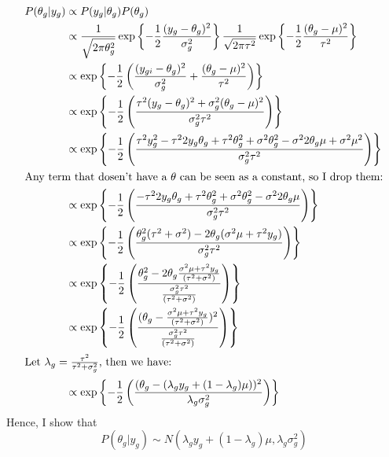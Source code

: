 \documentclass[paper=letter, fontsize=11pt]{scrartcl} %
\numberwithin{equation}{section} %
\numberwithin{figure}{section} %
\numberwithin{table}{section} %
\begin{document}
\subsection*{}
\begin{align*}
\begin{split}
P(\theta_g|y_{g}) &\propto P(y_{g}|\theta_g) P(\theta_g)\\
&\propto \frac{1}{\sqrt{2\pi\theta_g^2}}\exp\left\{-\frac{1}{2}\frac{(y_{g}-\theta_g)^2}{\sigma_g^2} \right\} \frac{1}{\sqrt{2\pi\tau^2}}\exp\left\{-\frac{1}{2}\frac{(\theta_g-\mu)^2}{\tau^2} \right\}\\
&\propto \exp\left\{-\frac{1}{2}\left(\frac{(y_{gi}-\theta_g)^2}{\sigma_g^2}+\frac{(\theta_g-\mu)^2}{\tau^2} \right)\right\}\\
&\propto \exp\left\{-\frac{1}{2}\left(\frac{\tau^2(y_{g}-\theta_g)^2+\sigma_g^2(\theta_g-\mu)^2}{\sigma_g^2\tau^2} \right)\right\}\\	
&\propto \exp\left\{-\frac{1}{2}\left(\frac{\tau^2 y_{g}^2-\tau^22y_{g}\theta_g + \tau^2\theta_g^2+\sigma^2\theta_g^2 - \sigma^22\theta_g\mu + \sigma^2\mu^2}{\sigma_g^2\tau^2} \right)\right\}\\
\intertext{Any term that dosen't have a $\theta$ can be seen as a constant, so I drop them:}	
&\propto \exp\left\{-\frac{1}{2}\left(\frac{-\tau^22y_{g}\theta_g + \tau^2\theta_g^2+\sigma^2\theta_g^2 - \sigma^22\theta_g\mu}{\sigma_g^2\tau^2} \right)\right\}\\
&\propto \exp\left\{-\frac{1}{2}\left(\frac{\theta_g^2(\tau^2+\sigma^2) - 2\theta_g(\sigma^2\mu + \tau^2y_{g})}{\sigma_g^2\tau^2} \right)\right\}\\
&\propto \exp\left\{-\frac{1}{2}\left(\frac{\theta_g^2 - 2\theta_g\frac{\sigma^2\mu + \tau^2y_{g}}{(\tau^2+\sigma^2)}}{\frac{\sigma_g^2\tau^2}{(\tau^2+\sigma^2)}} \right)\right\}\\
&\propto \exp\left\{-\frac{1}{2}\left(\frac{(\theta_g - \frac{\sigma^2\mu + \tau^2y_{g}}{(\tau^2+\sigma^2)})^2}{\frac{\sigma_g^2\tau^2}{(\tau^2+\sigma^2)}} \right)\right\}\\
\intertext{Let $\lambda_g = \frac{\tau^2}{\tau^2+\sigma_g^2}$, then we have:}	
&\propto \exp\left\{-\frac{1}{2}\left(\frac{(\theta_g -(\lambda_g y_g + (1-\lambda_g)\mu))^2}{\lambda_g\sigma_g^2} \right)\right\}\\
\end{split}
\end{align*}
Hence, I show that
\[
P(\theta_g|y_{g}) \sim N(\lambda_g y_g + (1-\lambda_g)\mu,\lambda_g\sigma_g^2)
\]
\end{document}
